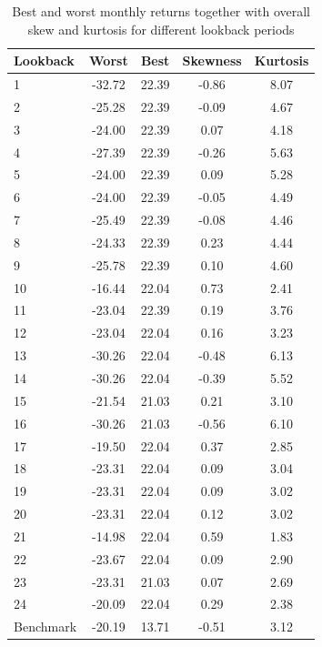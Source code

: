 \documentclass[a4paper,12pt,twoside]{article}
\begin{document}
\begin{table}[ht]
\centering
\begin{tabular}{@{}l
                c
                c
                c
                c@{}}
\toprule
Lookback & Worst  & Best   & Skewness & Kurtosis \\
\midrule
1        & -32.72 & 22.39  & -0.86    & 8.07     \\
2        & -25.28 & 22.39  & -0.09    & 4.67     \\
3        & -24.00 & 22.39  & 0.07     & 4.18     \\
4        & -27.39 & 22.39  & -0.26    & 5.63     \\
5        & -24.00 & 22.39  & 0.09     & 5.28     \\
6        & -24.00 & 22.39  & -0.05    & 4.49     \\
7        & -25.49 & 22.39  & -0.08    & 4.46     \\
8        & -24.33 & 22.39  & 0.23     & 4.44     \\
9        & -25.78 & 22.39  & 0.10     & 4.60     \\
10       & -16.44 & 22.04  & 0.73     & 2.41     \\
11       & -23.04 & 22.39  & 0.19     & 3.76     \\
12       & -23.04 & 22.04  & 0.16     & 3.23     \\
13       & -30.26 & 22.04  & -0.48    & 6.13     \\
14       & -30.26 & 22.04  & -0.39    & 5.52     \\
15       & -21.54 & 21.03  & 0.21     & 3.10     \\
16       & -30.26 & 21.03  & -0.56    & 6.10     \\
17       & -19.50 & 22.04  & 0.37     & 2.85     \\
18       & -23.31 & 22.04  & 0.09     & 3.04     \\
19       & -23.31 & 22.04  & 0.09     & 3.02     \\
20       & -23.31 & 22.04  & 0.12     & 3.02     \\
21       & -14.98 & 22.04  & 0.59     & 1.83     \\
22       & -23.67 & 22.04  & 0.09     & 2.90     \\
23       & -23.31 & 21.03  & 0.07     & 2.69     \\
24       & -20.09 & 22.04  & 0.29     & 2.38     \\
\midrule
Benchmark & -20.19 & 13.71  & -0.51    & 3.12     \\
\bottomrule
\end{tabular}
\caption{Best and worst monthly returns together with overall skew and kurtosis for different lookback periods}
\label{table:performance2}
\end{table}
\end{document}
